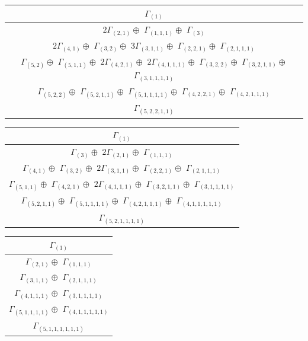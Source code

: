 \documentclass[main.tex]{subfiles}
\begin{document}
\bigskip
\begin{minipage}{1\textwidth}
\centering
\begin{tabular}{c}
$\Gamma_{(
1
)}$
\\ \hline
$2\Gamma_{(
2 , 
1
)} \oplus$
$\Gamma_{(
1 , 
1 , 
1
)} \oplus$
$\Gamma_{(
3
)}$
\\ \hline
$2\Gamma_{(
4 , 
1
)} \oplus$
$\Gamma_{(
3 , 
2
)} \oplus$
$3\Gamma_{(
3 , 
1 , 
1
)} \oplus$
$\Gamma_{(
2 , 
2 , 
1
)} \oplus$
$\Gamma_{(
2 , 
1 , 
1 , 
1
)} $
\\ \hline
$\Gamma_{(
5 , 
2
)} \oplus$
$\Gamma_{(
5 , 
1 , 
1
)} \oplus$
$2\Gamma_{(
4 , 
2 , 
1
)} \oplus$
$2\Gamma_{(
4 , 
1 , 
1 , 
1
)} \oplus$
$\Gamma_{(
3 , 
2 , 
2
)} \oplus$
$\Gamma_{(
3 , 
2 , 
1 , 
1
)} \oplus$
$\Gamma_{(
3 , 
1 , 
1 , 
1 , 
1
)}$
\\ \hline
$\Gamma_{(
5 , 
2 , 
2
)} \oplus$
$\Gamma_{(
5 , 
2 , 
1 , 
1
)} \oplus$
$\Gamma_{(
5 , 
1 , 
1 , 
1 , 
1
)} \oplus$
$\Gamma_{(
4 , 
2 , 
2 , 
1
)} \oplus$
$\Gamma_{(
4 , 
2 , 
1 , 
1 , 
1
)}$
\\ \hline
$\Gamma_{(
5 , 
2 , 
2 , 
1 , 
1
)}$
\\
\end{tabular}\end{minipage}
\bigskip
\begin{minipage}{.5\textwidth}
\centering
\begin{tabular}{c}
$\Gamma_{(
1
)}$
\\ \hline
$\Gamma_{(
3
)} \oplus$
$2\Gamma_{(
2 , 
1
)} \oplus$
$\Gamma_{(
1 , 
1 , 
1
)}$
\\ \hline
$\Gamma_{(
4 , 
1
)} \oplus$
$\Gamma_{(
3 , 
2
)} \oplus$
$2\Gamma_{(
3 , 
1 , 
1
)} \oplus$
$\Gamma_{(
2 , 
2 , 
1
)} \oplus$
$\Gamma_{(
2 , 
1 , 
1 , 
1
)}$
\\ \hline
$\Gamma_{(
5 , 
1 , 
1
)} \oplus$
$\Gamma_{(
4 , 
2 , 
1
)} \oplus$
$2\Gamma_{(
4 , 
1 , 
1 , 
1
)} \oplus$
$\Gamma_{(
3 , 
2 , 
1 , 
1
)} \oplus$
$\Gamma_{(
3 , 
1 , 
1 , 
1 , 
1
)}$
\\ \hline
$\Gamma_{(
5 , 
2 , 
1 , 
1
)} \oplus$
$\Gamma_{(
5 , 
1 , 
1 , 
1 , 
1
)} \oplus$
$\Gamma_{(
4 , 
2 , 
1 , 
1 , 
1
)} \oplus$
$\Gamma_{(
4 , 
1 , 
1 , 
1 , 
1 , 
1
)}$
\\ \hline
$\Gamma_{(
5 , 
2 , 
1 , 
1 , 
1 , 
1
)}$
\\
\end{tabular}\end{minipage}
\begin{minipage}{.3\textwidth}
\centering
\begin{tabular}{c}
$\Gamma_{(
1
)}$
\\ \hline
$\Gamma_{(
2 , 
1
)} \oplus$
$\Gamma_{(
1 , 
1 , 
1
)}$
\\ \hline
$\Gamma_{(
3 , 
1 , 
1
)} \oplus$
$\Gamma_{(
2 , 
1 , 
1 , 
1
)}$
\\ \hline
$\Gamma_{(
4 , 
1 , 
1 , 
1
)} \oplus$
$\Gamma_{(
3 , 
1 , 
1 , 
1 , 
1
)}$
\\ \hline
$\Gamma_{(
5 , 
1 , 
1 , 
1 , 
1
)} \oplus$
$\Gamma_{(
4 , 
1 , 
1 , 
1 , 
1 , 
1
)}$
\\ \hline
$\Gamma_{(
5 , 
1 , 
1 , 
1 , 
1 , 
1 , 
1
)}$
\\
\end{tabular}\end{minipage}
\end{document}
